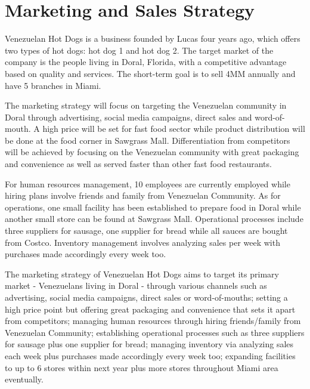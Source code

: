 

\section{Marketing and Sales Strategy} \label{sec:Marketing and Sales Strategy}
 Venezuelan Hot Dogs is a business founded by Lucas four years ago, which offers two types of hot dogs: hot dog 1 and hot dog 2. The target market of the company is the people living in Doral, Florida, with a competitive advantage based on quality and services. The short-term goal is to sell 4MM annually and have 5 branches in Miami. 

The marketing strategy will focus on targeting the Venezuelan community in Doral through advertising, social media campaigns, direct sales and word-of-mouth. A high price will be set for fast food sector while product distribution will be done at the food corner in Sawgrass Mall. Differentiation from competitors will be achieved by focusing on the Venezuelan community with great packaging and convenience as well as served faster than other fast food restaurants. 

For human resources management, 10 employees are currently employed while hiring plans involve friends and family from Venezuelan Community. As for operations, one small facility has been established to prepare food in Doral while another small store can be found at Sawgrass Mall. Operational processes include three suppliers for sausage, one supplier for bread while all sauces are bought from Costco. Inventory management involves analyzing sales per week with purchases made accordingly every week too. 

The marketing strategy of Venezuelan Hot Dogs aims to target its primary market - Venezuelans living in Doral - through various channels such as advertising, social media campaigns, direct sales or word-of-mouths; setting a high price point but offering great packaging and convenience that sets it apart from competitors; managing human resources through hiring friends/family from Venezuelan Community; establishing operational processes such as three suppliers for sausage plus one supplier for bread; managing inventory via analyzing sales each week plus purchases made accordingly every week too; expanding facilities to up to 6 stores within next year plus more stores throughout Miami area eventually.